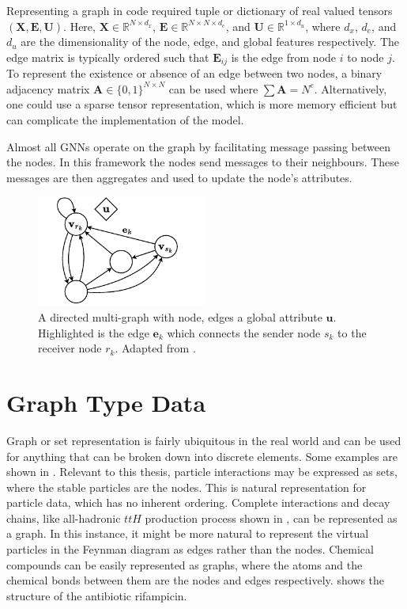 Representing a graph in code required tuple or dictionary of real valued tensors $(\mathbf{X}, \mathbf{E}, \mathbf{U})$.
Here, $\mathbf{X} \in \mathbb{R}^{N \times d_x}$, $\mathbf{E} \in \mathbb{R}^{N \times N \times d_e}$, and $\mathbf{U} \in \mathbb{R}^{1 \times d_u}$, where $d_x$, $d_e$, and $d_u$ are the dimensionality of the node, edge, and global features respectively.
The edge matrix is typically ordered such that $\mathbf{E}_{ij}$ is the edge from node $i$ to node $j$.
To represent the existence or absence of an edge between two nodes, a binary adjacency matrix $\mathbf{A} \in \{0, 1\}^{N \times N}$ can be used where $\sum{\mathbf{A}} = N^e$.
Alternatively, one could use a sparse tensor representation, which is more memory efficient but can complicate the implementation of the model.

Almost all GNNs operate on the graph by facilitating message passing between the nodes.
In this framework the nodes send messages to their neighbours.
These messages are then aggregates and used to update the node's attributes.

\begin{figure}
    \centering
    \includegraphics[width=0.5\textwidth]{Figures/transformers/graphs.pdf}
    \caption{A directed multi-graph with node, edges a global attribute $\mathbf{u}$. Highlighted is the edge $\mathbf{e}_{k}$ which connects the sender node $s_k$ to the receiver node $r_k$. Adapted from \textcite{RelationalInductiveBiases}.}
    \label{fig:graph}
\end{figure}

\section{Graph Type Data}

Graph or set representation is fairly ubiquitous in the real world and can be used for anything that can be broken down into discrete elements.
Some examples are shown in .
Relevant to this thesis, particle interactions may be expressed as sets, where the stable particles are the nodes.
This is natural representation for particle data, which has no inherent ordering.
Complete interactions and decay chains, like all-hadronic $ttH$ production process shown in , can be represented as a graph.
In this instance, it might be more natural to represent the virtual particles in the Feynman diagram as edges rather than the nodes.
Chemical compounds can be easily represented as graphs, where the atoms and the chemical bonds between them are the nodes and edges respectively.
 shows the structure of the antibiotic rifampicin.

